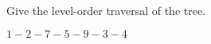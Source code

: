 \begin{blocksection}
\question Give the level-order traversal of the tree.

\begin{solution}[0.25in]
$1 - 2 - 7 - 5 - 9 - 3 - 4$
\end{solution}
\end{blocksection}
